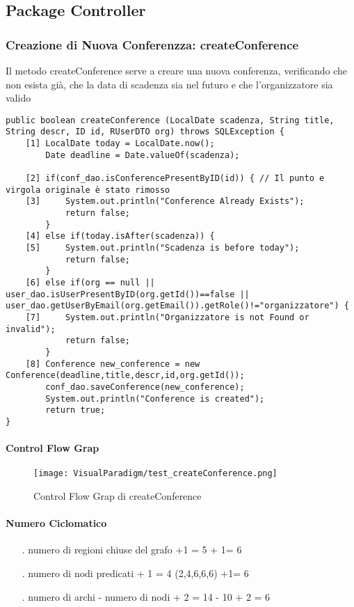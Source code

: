 \subsection{Package Controller}
\label{sec:test_strutturale_package_controller}

\subsubsection{Creazione di Nuova Conferenzza: createConference}
Il metodo createConference serve a creare una nuova conferenza, verificando che non esista già, che la data di scadenza sia nel futuro e che l'organizzatore sia valido
\begin{lstlisting}
public boolean createConference (LocalDate scadenza, String title, String descr, ID id, RUserDTO org) throws SQLException {
    [1] LocalDate today = LocalDate.now();
        Date deadline = Date.valueOf(scadenza);

    [2] if(conf_dao.isConferencePresentByID(id)) { // Il punto e virgola originale è stato rimosso
    [3]     System.out.println("Conference Already Exists");
            return false;
        }
    [4] else if(today.isAfter(scadenza)) {
    [5]     System.out.println("Scadenza is before today");
            return false;
        }
    [6] else if(org == null || user_dao.isUserPresentByID(org.getId())==false || user_dao.getUserByEmail(org.getEmail()).getRole()!="organizzatore") {
    [7]     System.out.println("Organizzatore is not Found or invalid");
            return false;
        }
    [8] Conference new_conference = new Conference(deadline,title,descr,id,org.getId());
        conf_dao.saveConference(new_conference);
        System.out.println("Conference is created");
        return true;
}
\end{lstlisting}
\paragraph{Control Flow Grap}
\begin{figure}[ht]
  \centering
  \texttt{[image: VisualParadigm/test\_createConference.png]}
  \caption{Control Flow Grap di createConference}
  \label{fig:cfg_create_conference }
\end{figure}
\paragraph{Numero Ciclomatico}
\begin{itemize}
\item[.] numero di regioni chiuse del grafo +1 = 5 + 1= 6 
\item[.] numero di nodi predicati + 1 = 4 (2,4,6,6,6) +1= 6
\item[.] numero di archi - numero di nodi + 2 = 14 - 10 + 2 = 6 
\end{itemize}
